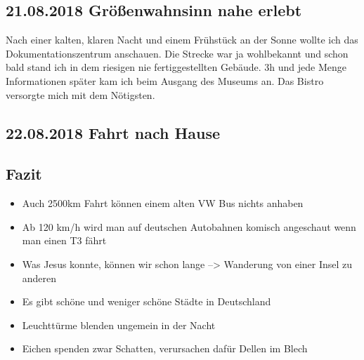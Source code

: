 \subsection{21.08.2018 Größenwahnsinn nahe erlebt}
Nach einer kalten, klaren Nacht und einem Frühstück an der Sonne wollte ich das Dokumentationszentrum anschauen.
Die Strecke war ja wohlbekannt und schon bald stand ich in dem riesigen nie fertiggestellten Gebäude.
3h und jede Menge Informationen später kam ich beim Ausgang des Museums an.
Das Bistro versorgte mich mit dem Nötigsten.

\subsection{22.08.2018 Fahrt nach Hause}
\subsection{Fazit}
\begin{itemize}
     \item Auch 2500km Fahrt können einem alten VW Bus nichts anhaben
     \item Ab 120 km/h wird man auf deutschen Autobahnen komisch angeschaut wenn man einen T3 fährt
     \item Was Jesus konnte, können wir schon lange --> Wanderung von einer Insel zu anderen
     \item Es gibt schöne und weniger schöne Städte in Deutschland
     \item Leuchttürme blenden ungemein in der Nacht
     \item Eichen spenden zwar Schatten, verursachen dafür Dellen im Blech
\end{itemize} 

